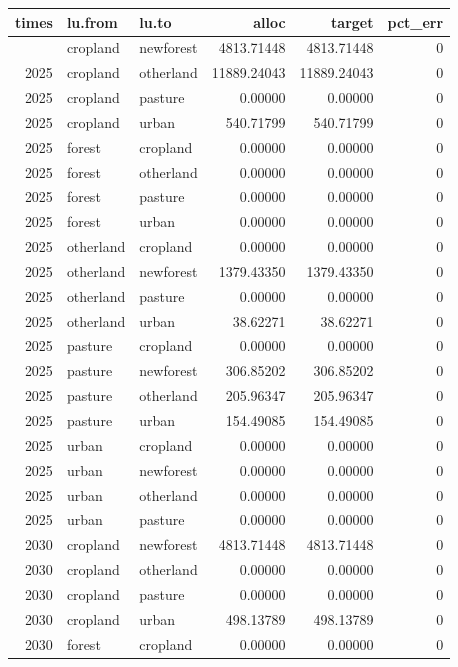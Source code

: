 \documentclass[
]{article}
\begin{document}
\begin{longtable}[]{@{}rllrrr@{}}
\toprule\noalign{}
times & lu.from & lu.to & alloc & target & pct\_err \\
\midrule\noalign{}
\endhead
\bottomrule\noalign{}
\endlastfoot
2025 & cropland & newforest & 4813.71448 & 4813.71448 & 0 \\
2025 & cropland & otherland & 11889.24043 & 11889.24043 & 0 \\
2025 & cropland & pasture & 0.00000 & 0.00000 & 0 \\
2025 & cropland & urban & 540.71799 & 540.71799 & 0 \\
2025 & forest & cropland & 0.00000 & 0.00000 & 0 \\
2025 & forest & otherland & 0.00000 & 0.00000 & 0 \\
2025 & forest & pasture & 0.00000 & 0.00000 & 0 \\
2025 & forest & urban & 0.00000 & 0.00000 & 0 \\
2025 & otherland & cropland & 0.00000 & 0.00000 & 0 \\
2025 & otherland & newforest & 1379.43350 & 1379.43350 & 0 \\
2025 & otherland & pasture & 0.00000 & 0.00000 & 0 \\
2025 & otherland & urban & 38.62271 & 38.62271 & 0 \\
2025 & pasture & cropland & 0.00000 & 0.00000 & 0 \\
2025 & pasture & newforest & 306.85202 & 306.85202 & 0 \\
2025 & pasture & otherland & 205.96347 & 205.96347 & 0 \\
2025 & pasture & urban & 154.49085 & 154.49085 & 0 \\
2025 & urban & cropland & 0.00000 & 0.00000 & 0 \\
2025 & urban & newforest & 0.00000 & 0.00000 & 0 \\
2025 & urban & otherland & 0.00000 & 0.00000 & 0 \\
2025 & urban & pasture & 0.00000 & 0.00000 & 0 \\
2030 & cropland & newforest & 4813.71448 & 4813.71448 & 0 \\
2030 & cropland & otherland & 0.00000 & 0.00000 & 0 \\
2030 & cropland & pasture & 0.00000 & 0.00000 & 0 \\
2030 & cropland & urban & 498.13789 & 498.13789 & 0 \\
2030 & forest & cropland & 0.00000 & 0.00000 & 0 \\

\end{longtable}
\end{document}
